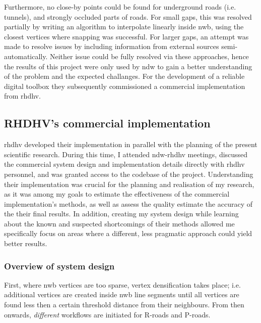 Furthermore, no close-by points could be found for underground roads (i.e. tunnels), and strongly occluded parts of roads. For small gaps, this was resolved partially by writing an algorithm to interpolate linearly inside \ac{nwb}, using the closest vertices where snapping was successful. For larger gaps, an attempt was made to resolve issues by including information from external sources semi-automatically. Neither issue could be fully resolved via these approaches, hence the results of this project were only used by \ac{ndw} to gain a better understanding of the problem and the expected challanges. For the development of a reliable digital toolbox they subsequently commissioned a commercial implementation from \ac{rhdhv}.

\subsection{RHDHV's commercial implementation}
\label{sub:commercialproduct}

\ac{rhdhv} developed their implementation in parallel with the planning of the present scientific research. During this time, I attended \ac{ndw}-\ac{rhdhv} meetings, discussed the commercial system design and implementation details directly with \ac{rhdhv} personnel, and was granted access to the codebase of the project. Understanding their implementation was crucial for the planning and realisation of my research, as it was among my goals to estimate the effectiveness of the commercial implementation's methods, as well as assess the quality estimate the accuracy of the their final results. In addition, creating my system design while learning about the known and suspected shortcomings of their methods allowed me specifically focus on areas where a different, less pragmatic approach could yield better results.

\subsubsection{Overview of system design}

First, where \ac{nwb} vertices are too sparse, vertex densification takes place; i.e. additional vertices are created inside \ac{nwb} line segments until all vertices are found less then a certain threshold distance from their neighbours. From then onwards, \textit{different} workflows are initiated for R-roads and P-roads.

